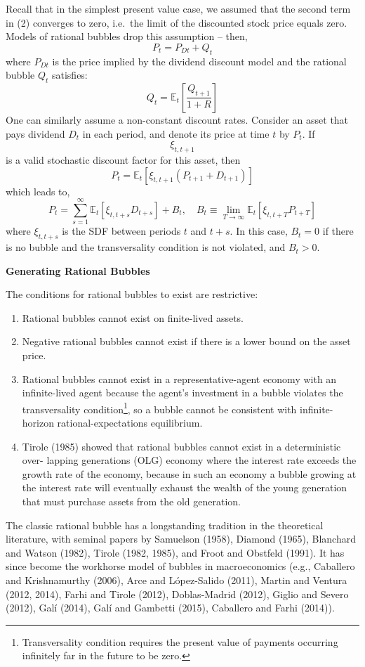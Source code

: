 \documentclass[
]{book}
\begin{document}
Recall that in the simplest present value case, we assumed that the second term in (2) converges to zero, i.e.~the limit of the discounted stock price equals zero. Models of rational bubbles drop this assumption -- then, \[P_t = P_{Dt} + Q_t\] where \(P_{Dt}\) is the price implied by the dividend discount model and the rational bubble \(Q_{t}\) satisfies:
\[
Q_{t}=\mathbb{E}_{t}\left[\frac{Q_{t+1}}{1+R}\right]
\]
One can similarly assume a non-constant discount rates. Consider an asset that pays dividend \(D_t\) in each period, and denote its price at time \(t\) by \(P_t\). If \[\xi_{t,t+1}\] is a valid stochastic discount factor for this asset, then
\[
P_t = \mathbb{E}_t[\xi_{t,t+1}(P_{t+1} + D_{t+1})]
\]
which leads to,
\[
P_t = \sum_{s=1}^\infty \mathbb{E}_t[\xi_{t,t+s}D_{t+s}]+B_t,\quad B_t \equiv \lim_{T\to\infty} \mathbb{E}_t[\xi_{t,t+T}P_{t+T}]
\]
where \(\xi_{t,t+s}\) is the SDF between periods \(t\) and \(t+s\). In this case, \(B_t=0\) if there is no bubble and the transversality condition is not violated, and \(B_t > 0\).

\textbf{Generating Rational Bubbles}

The conditions for rational bubbles to exist are restrictive:

\begin{enumerate}
\def\labelenumi{\arabic{enumi}.}
\item
  Rational bubbles cannot exist on finite-lived assets.
\item
  Negative rational bubbles cannot exist if there is a lower bound on the asset price.
\item
  Rational bubbles cannot exist in a representative-agent economy with an infinite-lived agent because the agent's investment in a bubble violates the transversality condition\footnote{Transversality condition requires the present value of payments occurring infinitely far in the future to be zero.}, so a bubble cannot be consistent with infinite-horizon rational-expectations equilibrium.
\item
  Tirole (1985) showed that rational bubbles cannot exist in a deterministic over- lapping generations (OLG) economy where the interest rate exceeds the growth rate of the economy, because in such an economy a bubble growing at the interest rate will eventually exhaust the wealth of the young generation that must purchase assets from the old generation.
\end{enumerate}

The classic rational bubble has a longstanding tradition in the theoretical literature, with seminal papers by Samuelson (1958), Diamond (1965), Blanchard and Watson (1982), Tirole (1982, 1985), and Froot and Obstfeld (1991). It has since become the workhorse model of bubbles in macroeconomics (e.g., Caballero and Krishnamurthy (2006), Arce and López-Salido (2011), Martin and Ventura (2012, 2014), Farhi and Tirole (2012), Doblas-Madrid (2012), Giglio and Severo (2012), Galí (2014), Galí and Gambetti (2015), Caballero and Farhi (2014)).
\end{document}

